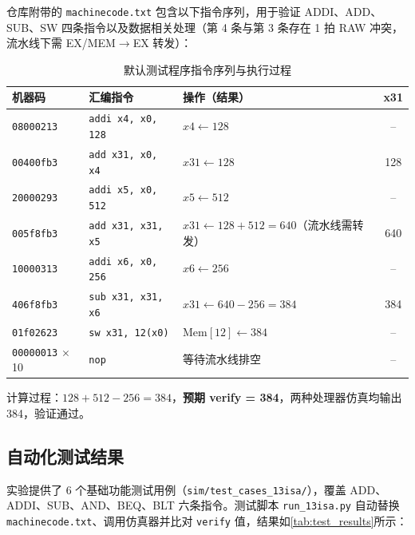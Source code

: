 \documentclass[12pt,hyperref,a4paper,UTF8]{ctexart}
\begin{document}
仓库附带的 \texttt{machinecode.txt} 包含以下指令序列，用于验证 ADDI、ADD、SUB、SW 四条指令以及数据相关处理（第 4 条与第 3 条存在 1 拍 RAW 冲突，流水线下需 EX/MEM$\rightarrow$EX 转发）：

\begin{table}[H]
    \centering
    \caption{默认测试程序指令序列与执行过程}
    \label{tab:default_prog}
    \begin{tabular}{lllc}
        \toprule
        机器码 & 汇编指令 & 操作（结果） & x31 \\
        \midrule
        \texttt{08000213} & \texttt{addi x4, x0, 128}  & $x4 \leftarrow 128$ & -- \\
        \texttt{00400fb3} & \texttt{add x31, x0, x4}   & $x31 \leftarrow 128$ & 128 \\
        \texttt{20000293} & \texttt{addi x5, x0, 512}  & $x5 \leftarrow 512$ & -- \\
        \texttt{005f8fb3} & \texttt{add x31, x31, x5}  & $x31 \leftarrow 128+512=640$（流水线需转发）& 640 \\
        \texttt{10000313} & \texttt{addi x6, x0, 256}  & $x6 \leftarrow 256$ & -- \\
        \texttt{406f8fb3} & \texttt{sub x31, x31, x6}  & $x31 \leftarrow 640-256=384$ & 384 \\
        \texttt{01f02623} & \texttt{sw x31, 12(x0)}    & $\text{Mem}[12] \leftarrow 384$ & -- \\
        \texttt{00000013} $\times$10 & \texttt{nop} & 等待流水线排空 & -- \\
        \bottomrule
    \end{tabular}
\end{table}

计算过程：$128 + 512 - 256 = 384$，\textbf{预期 verify = 384}，两种处理器仿真均输出 384，验证通过。

\subsection{自动化测试结果}

实验提供了 6 个基础功能测试用例（\texttt{sim/test\_cases\_13isa/}），覆盖 ADD、ADDI、SUB、AND、BEQ、BLT 六条指令。测试脚本 \texttt{run\_13isa.py} 自动替换 \texttt{machinecode.txt}、调用仿真器并比对 \texttt{verify} 值，结果如\autoref{tab:test_results}所示：
\end{document}
